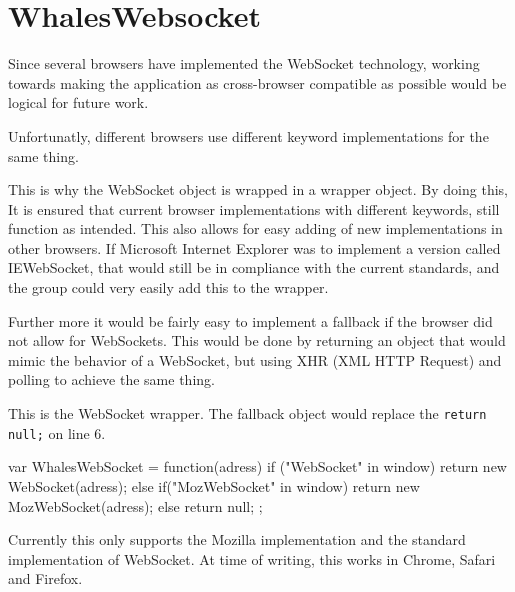 \section{WhalesWebsocket}

Since several browsers have implemented the WebSocket technology, working towards making the
application as cross-browser compatible as possible would be logical for future work.

Unfortunatly, different browsers use different keyword implementations for the same thing.

This is why the WebSocket object is wrapped in a wrapper object.
By doing this, It is ensured that current browser implementations with different
keywords, still function as intended. This also allows for easy adding of new
implementations in other browsers. If Microsoft Internet Explorer was to
implement a version called IEWebSocket, that would still be in compliance with the current
standards, and the group could very easily add this to the wrapper.

Further more it would be fairly easy to
implement a fallback if the browser did not allow for WebSockets. This would be
done by returning an object that would mimic the behavior of a WebSocket, but
using XHR (XML HTTP Request) and polling to achieve the same thing.


This is the WebSocket wrapper. 
The fallback object would replace the 
\lstinline$return null;$ on line 6.

 \begin{snippet}[language=JavaScript,caption=Our WebSocket abstraction object] 
 var WhalesWebSocket = function(adress) { if ("WebSocket" in window) { return new WebSocket(adress);
    } else if("MozWebSocket" in window) {
        return new MozWebSocket(adress);
    } else {
        return null;
    }
};
\end{snippet}

Currently this only supports the Mozilla implementation and the standard
implementation of WebSocket. At time of writing, this works in Chrome, Safari
and Firefox.